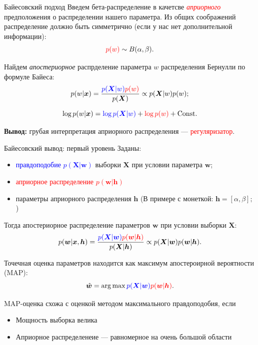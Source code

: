 \documentclass[9pt,pdf,utf8,hyperref={unicode},aspectratio=169]{beamer}
\DeclareMathOperator*{\argmax}{arg\,max}
\begin{document}
\begin{frame}{Байесовский подход}
Введем бета-распределение в качетсве  \textcolor{red}{\textit{априорного}} предположения о распределении нашего параметра. Из общих соображений распределение должно быть симметрично (если у нас нет дополнительной информации):
\[
    \textcolor{red}{p(w)} \sim B(\alpha, \beta).
\]

Найдем \textit{апостериорное} распрделение параметра $w$ распределения Бернулли по формуле Байеса:
\[
    p(w|\boldsymbol{x}) = \frac{\textcolor{blue}{p(\boldsymbol{X}|w)} \textcolor{red}{p(w)}}{p(\boldsymbol{X})} \propto p(\boldsymbol{X}|w) p(w);
\]

$$\log p(w|\boldsymbol{x}) = \textcolor{blue}{\log p(\boldsymbol{X}|w)} + \textcolor{red}{\log p(w)} + \text{Const}.$$

\textbf{Вывод:} грубая интерпретация априорного распределения --- \textcolor{red}{регуляризатор}.

\end{frame}


\begin{frame}{Байесовский вывод: первый уровень}
Заданы:
\begin{itemize}
\item \textcolor{blue}{правдоподобие $p(\boldsymbol{X}|\boldsymbol{w})$} выборки $\boldsymbol{X}$ при условии параметра $\boldsymbol{w}$;
\item \textcolor{red}{априорное распределение $p(\boldsymbol{w}|\boldsymbol{h})$}
\item параметры априорного распределения $\boldsymbol{h}$ (В примере с монеткой: $\boldsymbol{h} = [\alpha, \beta];$)
\end{itemize}

Тогда апостериорное распределение параметров $\boldsymbol{w}$ при условии выборки $\boldsymbol{X}$:
$$p(\boldsymbol{w}|\boldsymbol{x}, \boldsymbol{h}) = \frac{\textcolor{blue}{p(\boldsymbol{X}|\boldsymbol{w})}\textcolor{red}{p(\boldsymbol{w}|\boldsymbol{h})}}{p(\boldsymbol{X}|\boldsymbol{h})} \propto p(\boldsymbol{X}|\boldsymbol{w}) p(\boldsymbol{w}|\boldsymbol{h}).$$

Точечная оценка параметров находится как максимум апостероирной вероятности (MAP):
\[
    \hat{\boldsymbol{w}} = \argmax \textcolor{blue}{p(\boldsymbol{X}|\boldsymbol{w})}\textcolor{red}{p(\boldsymbol{w}|\boldsymbol{h})}.
\]

MAP-оценка схожа с  оценкой методом максимального правдоподобия, если 
\begin{itemize}
\item Мощность выборка велика 
\item Априорное распределенеие --- равномерное на очень большой области 
\end{itemize}
\end{frame}
\end{document}
